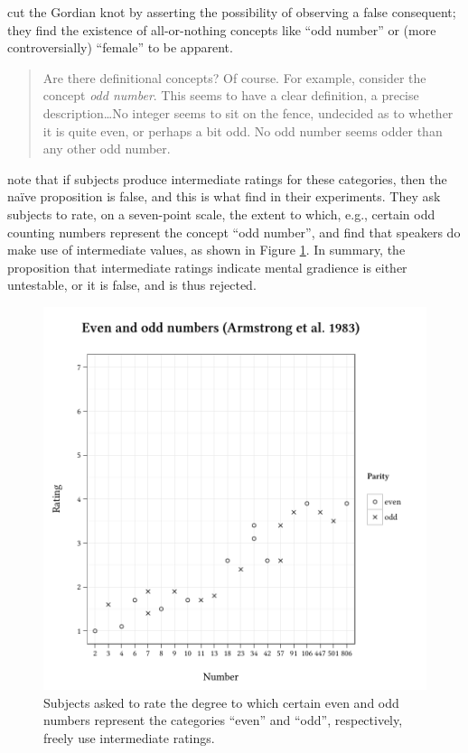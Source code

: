 \citet{Armstrong1983} cut the Gordian knot by asserting the possibility of observing a false consequent; they find the existence of all-or-nothing concepts like ``odd number'' or (more controversially) ``female'' to be apparent.

\begin{quote}
Are there definitional concepts? Of course. For example, consider the concept \emph{odd number}. This seems to have a clear definition, a precise description\ldots{}No integer seems to sit on the fence, undecided as to whether it is quite even, or perhaps a bit odd. No odd number seems odder than any other odd number. \citep[274]{Armstrong1983}
\end{quote}

\citeauthor{Armstrong1983} note that if subjects produce intermediate ratings for these categories, then the naïve proposition is false, and this is what \citeauthor{Armstrong1983} find in their experiments. They ask subjects to rate, on a seven-point scale, the extent to which, e.g., certain odd counting numbers represent the concept ``odd number'', and find that speakers do make use of intermediate values, as shown in Figure \ref{agg}. In summary, the proposition that intermediate ratings indicate mental gradience is either untestable, or it is false, and is thus rejected.

\begin{figure} \centering
\includegraphics{agg.pdf}
\caption{Subjects asked to rate the degree to which certain even and odd numbers represent the categories ``even'' and ``odd'', respectively, freely use intermediate ratings.}
\label{agg} 
\end{figure}

